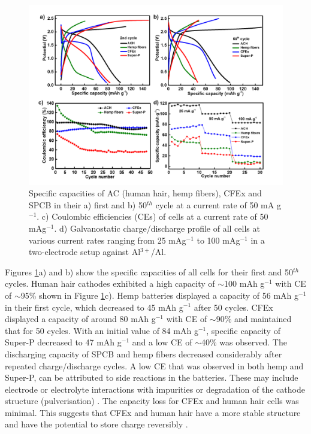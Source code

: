\documentclass{article}
\begin{document}
\begin{figure}[]
  \centering
  \includegraphics[width=\textwidth]{fig/CDCall}
    \caption{Specific capacities of AC (human hair, hemp fibers), CFEx and SPCB in their a) first and b) 50$^{th}$ cycle at a current rate of 50 mA g$^{-1}$. c) Coulombic efficiencies (CEs) of cells at a current rate of 50 mAg$^{-1}$. d) Galvanostatic charge/discharge profile of all cells at various current rates ranging from 25 mAg$^{-1}$ to 100 mAg$^{-1}$ in a two-electrode setup against Al$^{3+}$/Al.}
  \label{fig:CDCall}
\end{figure}

Figures \ref{fig:CDCall}a) and b) show the specific capacities of all cells for their first and 50$^{th}$ cycles. Human hair cathodes exhibited a high capacity of $\sim$100 mAh g$^{-1}$ with CE of $\sim$95\% shown in Figure \ref{fig:CDCall}c). Hemp batteries displayed a capacity of 56 mAh g$^{-1}$ in their first cycle, which decreased to 45 mAh g$^{-1}$ after 50 cycles. CFEx displayed a capacity of around 80 mAh g$^{-1}$ with CE of $\sim$90\% and maintained that for 50 cycles. With an initial value of 84 mAh g$^{-1}$, specific capacity of Super-P decreased to 47 mAh g$^{-1}$ and a low CE of $\sim$40\% was observed. The discharging capacity of SPCB and hemp fibers decreased considerably after repeated charge/discharge cycles. A low CE that was observed in both hemp and Super-P, can be attributed to side reactions in the batteries. These may include electrode or electrolyte interactions with impurities or degradation of the cathode structure (pulverisation) \cite{gyenes_understanding_2015-1}. The capacity loss for CFEx and human hair cells was minimal. This suggests that CFEx and human hair have a more stable structure and have the potential to store charge reversibly \cite{pramanick_human_2016}.
\end{document}
